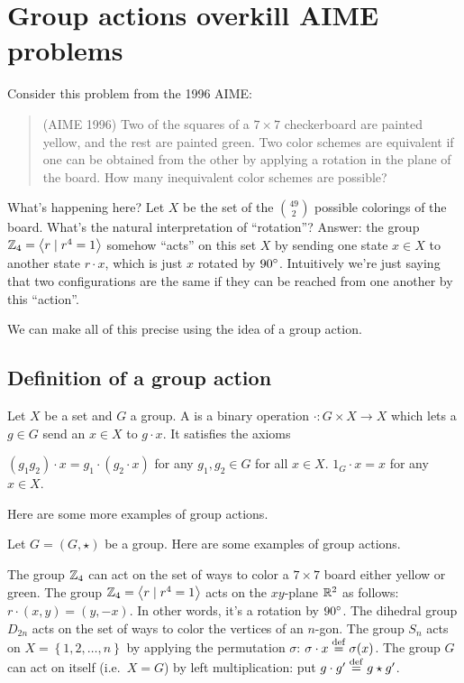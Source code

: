\chapter{Group actions overkill AIME problems}
Consider this problem from the 1996 AIME:
\begin{quote}
	(AIME 1996) Two of the squares of a $7 \times 7$ checkerboard are painted yellow, and the rest are painted green. Two color schemes are equivalent if one can be obtained from the other by applying a rotation in the plane of the board. How many inequivalent color schemes are possible?
\end{quote}

What's happening here? Let $X$ be the set of the $\binom{49}{2}$ possible colorings of the board.
What's the natural interpretation of ``rotation''?
Answer: the group $\mathbb Z_{4} = \left<r \mid r^4=1\right>$ somehow ``acts'' on this set $X$ by sending one state $x \in X$ to another state $r \cdot x$, which is just $x$ rotated by $90^\circ$.
Intuitively we're just saying that two configurations are the same if they can be reached from one another by this ``action''.

We can make all of this precise using the idea of a group action.

\section{Definition of a group action}

\begin{definition}
	Let $X$ be a set and $G$ a group.
	A  is a binary operation $\cdot : G \times X \to X$
	which lets a $g \in G$ send an $x \in X$ to $g \cdot x$.
	It satisfies the axioms
	\begin{itemize}
		\ii $(g_1g_2) \cdot x = g_1 \cdot (g_2 \cdot x)$ for any $g_1, g_2 \in G$
		for all $x \in X$.
		\ii $1_G \cdot x = x$ for any $x \in X$.
	\end{itemize}
\end{definition}

Here are some more examples of group actions.
\begin{example}
	Let $G=(G,\star)$ be a group.
	Here are some examples of group actions.
	\begin{enumerate}[(a)]
		\ii The group $\mathbb Z_{4}$ can act on the set of ways to color a $7 \times 7$
		board either yellow or green.
		\ii The group $\mathbb Z_{4} = \left<r \mid r^4=1\right>$ acts on the $xy$-plane $\mathbb R^2$ as follows: $r \cdot (x,y) = (y,-x)$.
		In other words, it's a rotation by $90^\circ$.
		\ii The dihedral group $D_{2n}$ acts on the set of ways to color the vertices of an $n$-gon.
		\ii The group $S_n$ acts on $X = \left\{ 1,2,\dots,n \right\}$
		by applying the permutation $\sigma$: $\sigma \cdot x \overset{\mathrm{def}}{=} \sigma(x)$.
		\ii The group $G$ can act on itself (i.e.\ $X=G$) by left multiplication: put $g \cdot g' \overset{\mathrm{def}}{=} g \star g'$.
	\end{enumerate}
\end{example}

